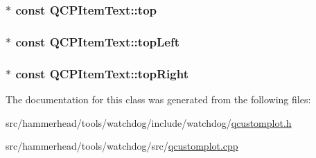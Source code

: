 \subsubsection[{\texorpdfstring{top}{top}}]{$\ast$ const Q\+C\+P\+Item\+Text\+::top}\hypertarget{classQCPItemText_a5c87ee162cbbe3d166b97826c8849304}{}\label{classQCPItemText_a5c87ee162cbbe3d166b97826c8849304}
\subsubsection[{\texorpdfstring{top\+Left}{topLeft}}]{$\ast$ const Q\+C\+P\+Item\+Text\+::top\+Left}\hypertarget{classQCPItemText_a6354d8762182a3502103fabe5fbb8512}{}\label{classQCPItemText_a6354d8762182a3502103fabe5fbb8512}
\subsubsection[{\texorpdfstring{top\+Right}{topRight}}]{$\ast$ const Q\+C\+P\+Item\+Text\+::top\+Right}\hypertarget{classQCPItemText_ad18ac45cb4cc135de1eb78f2e86b6504}{}\label{classQCPItemText_ad18ac45cb4cc135de1eb78f2e86b6504}


The documentation for this class was generated from the following files\+:\begin{DoxyCompactItemize}
\item 
src/hammerhead/tools/watchdog/include/watchdog/\hyperlink{qcustomplot_8h}{qcustomplot.\+h}\item 
src/hammerhead/tools/watchdog/src/\hyperlink{qcustomplot_8cpp}{qcustomplot.\+cpp}\end{DoxyCompactItemize}
